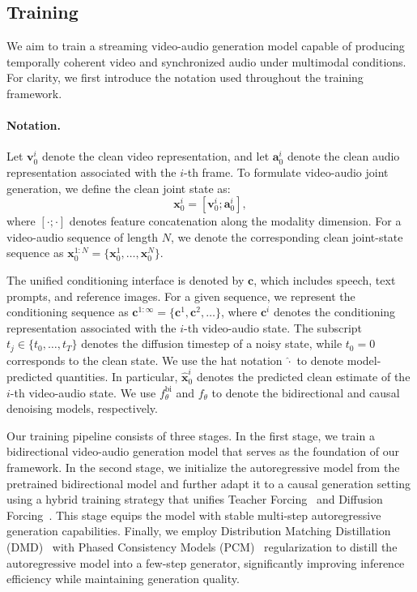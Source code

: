 \subsection{Training}

We aim to train a streaming video-audio generation model capable of producing temporally coherent video and synchronized audio under multimodal conditions. For clarity, we first introduce the notation used throughout the training framework.
\paragraph{Notation.}
Let ${\bm{v}}_0^i$ denote the clean video representation, and let ${\bm{a}}_0^i$ denote the clean audio representation associated with the $i$-th frame.
To formulate video-audio joint generation, we define the clean joint state as:
\begin{equation}
{\bm{x}}_0^i = [{\bm{v}}_0^i;{\bm{a}}_0^i],
\end{equation}
where $[\cdot;\cdot]$ denotes feature concatenation along the modality dimension.
For a video-audio sequence of length $N$, we denote the corresponding clean joint-state sequence as ${\bm{x}}_0^{1:N}=\{{\bm{x}}_0^1,\ldots,{\bm{x}}_0^N\}$.

The unified conditioning interface is denoted by ${\bm{c}}$, which includes speech, text prompts, and reference images.
For a given sequence, we represent the conditioning sequence as ${\bm{c}}^{1:\infty}=\{{\bm{c}}^1,{\bm{c}}^2,\ldots\}$, where ${\bm{c}}^i$ denotes the conditioning representation associated with the $i$-th video-audio state. 
The subscript $t_j \in \{t_0, \dots, t_T\}$ denotes the diffusion timestep of a noisy state, while $t_0=0$ corresponds to the clean state.
We use the hat notation $\hat{\cdot}$ to denote model-predicted quantities. 
In particular, $\hat{{\bm{x}}}_{0}^{i}$ denotes the predicted clean estimate of the $i$-th video-audio state. 
We use $f_\theta^{\mathrm{bi}}$ and $f_\theta$ to denote the bidirectional and causal denoising models, respectively.


Our training pipeline consists of three stages. 
In the first stage, we train a bidirectional video-audio generation model that serves as the foundation of our framework. 
In the second stage, we initialize the autoregressive model from the pretrained bidirectional model and further adapt it to a causal generation setting using a hybrid training strategy that unifies Teacher Forcing~\citep{gao2025ca2vdmefficientautoregressivevideo,jin2025pyramidal} and Diffusion Forcing~\cite{DF}.
This stage equips the model with stable multi-step autoregressive generation capabilities.
Finally, we employ  Distribution Matching Distillation (DMD)~\cite{yin2024one} with Phased Consistency Models (PCM)~\cite{wang2024phased} regularization to distill the autoregressive model into a few-step generator, significantly improving inference efficiency while maintaining generation quality.

